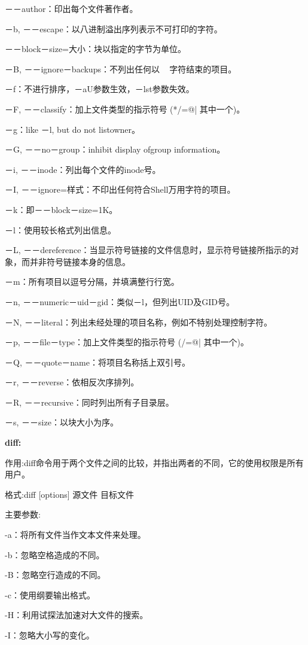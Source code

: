 －－author：印出每个文件著作者。

－b, －－escape：以八进制溢出序列表示不可打印的字符。

－－block－size=大小：块以指定的字节为单位。

－B, －－ignore－backups：不列出任何以 ~ 字符结束的项目。

－f：不进行排序，－aU参数生效，－lst参数失效。

－F, －－classify：加上文件类型的指示符号 (*/=@| 其中一个)。

－g：like －l, but do not listowner。

－G, －－no－group：inhibit display ofgroup information。

－i, －－inode：列出每个文件的inode号。

－I, －－ignore=样式：不印出任何符合Shell万用字符的项目。

－k：即－－block－size=1K。

－l：使用较长格式列出信息。

－L, －－dereference：当显示符号链接的文件信息时，显示符号链接所指示的对象，而并非符号链接本身的信息。

－m：所有项目以逗号分隔，并填满整行行宽。

－n, －－numeric－uid－gid：类似－l，但列出UID及GID号。

－N, －－literal：列出未经处理的项目名称，例如不特别处理控制字符。

－p, －－file－type：加上文件类型的指示符号 (/=@| 其中一个)。

－Q, －－quote－name：将项目名称括上双引号。

－r, －－reverse：依相反次序排列。

－R, －－recursive：同时列出所有子目录层。

－s, －－size：以块大小为序。

\textbf{diff:}

作用:diff命令用于两个文件之间的比较，并指出两者的不同，它的使用权限是所有用户。

格式:diff [options] 源文件 目标文件

主要参数:

-a：将所有文件当作文本文件来处理。

-b：忽略空格造成的不同。

-B：忽略空行造成的不同。

-c：使用纲要输出格式。

-H：利用试探法加速对大文件的搜索。

-I：忽略大小写的变化。

